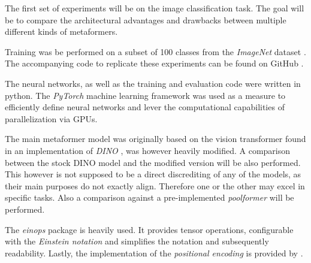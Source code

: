 The first set of experiments will be on the image classification task.
The goal will be to compare the architectural advantages and drawbacks between multiple different kinds of metaformers.

Training was be performed on a subset of 100 classes from the \emph{ImageNet} dataset \cite{imagenetDataset}.
The accompanying code to replicate these experiments can be found on GitHub \cite{selfComputerScience}.

The neural networks, as well as the training and evaluation code were written in python.
The \emph{PyTorch} \cite{pytorchGithub} machine learning framework was used as a measure to efficiently define neural networks and lever the computational capabilities of parallelization via GPUs.

The main metaformer model was originally based on the vision transformer found in an implementation of \emph{DINO} \cite{dinoGithub}, was however heavily modified. 
A comparison between the stock DINO model and the modified version will be also performed.
This however is not supposed to be a direct discrediting of any of the models, as their main purposes do not exactly align.
Therefore one or the other may excel in specific tasks.
Also a comparison against a pre-implemented \emph{poolformer} \cite{poolformerGithub} will be performed.

The \emph{einops} package \cite{einopsGithub} is heavily used. It provides tensor operations, configurable with the \emph{Einstein notation} and simplifies the notation and subsequently readability.
Lastly, the implementation of the \emph{positional encoding} is provided by \cite{positionalEncodingGithub}.
